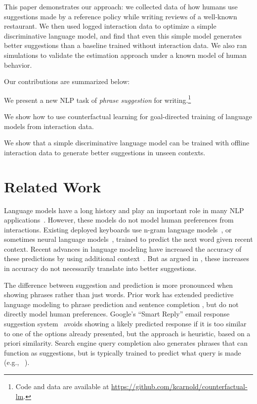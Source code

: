 \documentclass[11pt,letterpaper]{article}
\begin{document}
This paper demonstrates our approach: we collected data of how humans use suggestions made by a reference policy while writing reviews of a well-known restaurant. We then used logged interaction data to optimize a simple discriminative language model, and find that even this simple model
%
generates better suggestions than a baseline trained without interaction data.
We also ran simulations to validate the estimation approach under a known model of human behavior.

Our contributions are summarized below:

\begin{compactitem}
	\item We present a new NLP task of {\em phrase suggestion} for writing.\footnote{Code and data are available at \url{https://github.com/kcarnold/counterfactual-lm}.}
	\item We show how to use counterfactual learning for goal-directed training of language models from interaction data.%
	\item We show that a simple discriminative language model can be trained with offline interaction data to generate better suggestions in unseen contexts.
\end{compactitem}


\section{Related Work}
%
%
%
%
%
Language models have a long history and  play an important role in many NLP applications~\cite{sordoni15conversation,rambow2001natural,mani-book01,JohnsonSLKWCTVW16}.
However, these models do not model human preferences from interactions.
%
%
%
%
Existing deployed keyboards use n-gram language models~\cite{Quinn2016:CostBenefitSuggestion,kneser1995improved}, or sometimes neural language models~\cite{kim2016character}, trained to predict the next word given recent context. Recent advances in language modeling have increased the accuracy of these predictions by using additional context~\cite{mikolov2012context}. But as argued in \citet{megasuggestUI}, these increases in accuracy do not necessarily translate into better suggestions.

The difference between suggestion and prediction is more pronounced when showing phrases rather than just words. Prior work has extended predictive language modeling to phrase prediction \cite{nandi2007effective} and sentence completion \cite{bickel2005learning}, but do not directly model human preferences. Google's ``Smart Reply'' email response suggestion system~\cite{smartreply2016} avoids showing a likely predicted response if it is too similar to one of the options already presented, but the approach is heuristic, based on a priori similarity. Search engine query completion also generates phrases that can function as suggestions, but is typically trained to predict what query is made (e.g., ~\citet{Jiang:2014:LUR:2600428.2609614}).
%
\end{document}
